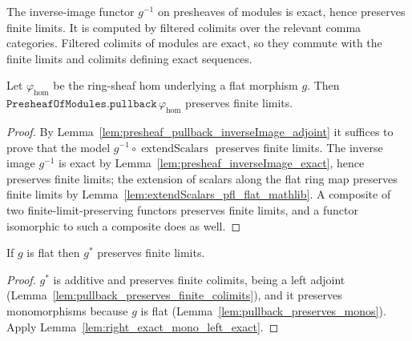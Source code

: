 \begin{lemma}
  \label{lem:presheaf_inverseImage_exact}
  The inverse-image functor \(g^{-1}\) on presheaves of modules is exact, hence
  preserves finite limits. It is computed by filtered colimits over the relevant comma
  categories. Filtered colimits of modules are exact, so they commute with the finite
  limits and colimits defining exact sequences.
\end{lemma}

\begin{lemma}
  \label{lem:presheaf_pullback_pfl_flat}
  Let \(\varphi_{\mathrm{hom}}\) be the ring-sheaf hom underlying a flat morphism
  \(g\). Then \(\texttt{PresheafOfModules.pullback}\,\varphi_{\mathrm{hom}}\) preserves
  finite limits.
\end{lemma}

\begin{proof}
  By Lemma~\ref{lem:presheaf_pullback_inverseImage_adjoint} it suffices to prove that
  the model \(g^{-1} \circ \operatorname{extendScalars}\) preserves finite limits. The
  inverse image \(g^{-1}\) is exact by
  Lemma~\ref{lem:presheaf_inverseImage_exact}, hence preserves finite limits; the
  extension of scalars along the flat ring map preserves finite limits by
  Lemma~\ref{lem:extendScalars_pfl_flat_mathlib}. A composite of two
  finite-limit-preserving functors preserves finite limits, and a functor isomorphic
  to such a composite does as well.
\end{proof}

\begin{lemma}
  \label{lem:pullback_preserves_finite_limits}
  If \(g\) is flat then \(g^*\) preserves finite limits.
\end{lemma}

\begin{proof}
  \(g^*\) is additive and preserves finite colimits, being a left adjoint
  (Lemma~\ref{lem:pullback_preserves_finite_colimits}), and it preserves monomorphisms because
  \(g\) is flat (Lemma~\ref{lem:pullback_preserves_monos}). Apply
  Lemma~\ref{lem:right_exact_mono_left_exact}.
\end{proof}

